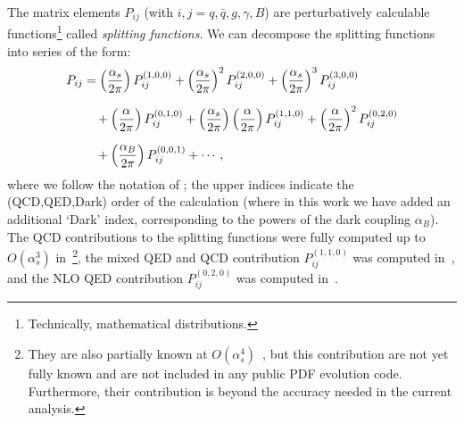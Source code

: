 \documentclass[withindex,glossary]{cam-thesis}
\begin{document}
The matrix elements $P_{ij}$ (with $i,j=q,\bar{q},g,\gamma,B$) are perturbatively calculable functions\footnote{Technically, mathematical distributions.} called \textit{splitting functions}. We can decompose the splitting functions into series of the form:
\begin{align}
\label{eq:splittingexpansion}
P_{ij} &= \left( \frac{\alpha_s}{2\pi} \right) P_{ij}^{(1,0,0)} + \left( \frac{\alpha_s}{2\pi} \right)^2 P_{ij}^{(2,0,0)} + \left(\frac{\alpha_s}{2\pi}\right)^3 P_{ij}^{(3,0,0)} \notag\\[1.5ex]
&\quad+ \left( \frac{\alpha}{2\pi} \right) P_{ij}^{(0,1,0)} + \left( \frac{\alpha_s}{2\pi} \right) \left( \frac{\alpha}{2\pi} \right) P_{ij}^{(1,1,0)} + \left( \frac{\alpha}{2\pi} \right)^2 P_{ij}^{(0,2,0)} \\[1.5ex]
&\quad+ \left( \frac{\alpha_B}{2\pi} \right) P_{ij}^{(0,0,1)} + \cdots, \notag
\end{align}
where we follow the notation of \cite{deFlorian:2015ujt,deFlorian:2016gvk}; the upper indices indicate
the (QCD,QED,Dark) order of the calculation (where in this work we have added an additional `Dark' index, corresponding
to the powers of the dark coupling $\alpha_B$). The QCD contributions
to the splitting functions were fully computed up to $O(\alpha_s^3)$
in~\cite{Vogt:2004mw,Moch:2004pa,Blumlein:2021enk}\footnote{They are also partially
  known at $O(\alpha_s^4)$~\cite{Moch:2021qrk}, but this contribution
  are not yet fully known and are not included in any public 
PDF evolution code. Furthermore,
their contribution is beyond the accuracy needed in the current analysis.}, the mixed QED and QCD contribution $P_{ij}^{(1,1,0)}$
was computed in~\cite{deFlorian:2015ujt}, and the NLO QED contribution $P_{ij}^{(0,2,0)}$ was computed in~\cite{deFlorian:2016gvk}.
\end{document}
